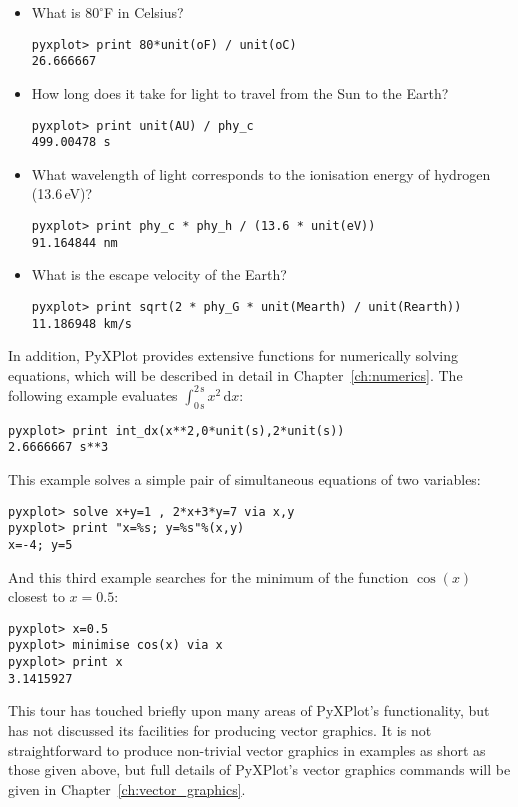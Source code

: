 \begin{itemize}
\item What is $80^\circ$F in Celsius?
\begin{verbatim}
pyxplot> print 80*unit(oF) / unit(oC)
26.666667
\end{verbatim}

\item How long does it take for light to travel from the Sun to the Earth?
\begin{verbatim}
pyxplot> print unit(AU) / phy_c
499.00478 s
\end{verbatim}

\item What wavelength of light corresponds to the ionisation energy of hydrogen (13.6\,eV)?
\begin{verbatim}
pyxplot> print phy_c * phy_h / (13.6 * unit(eV))
91.164844 nm
\end{verbatim}

\item What is the escape velocity of the Earth?
\begin{verbatim}
pyxplot> print sqrt(2 * phy_G * unit(Mearth) / unit(Rearth))
11.186948 km/s
\end{verbatim}
\end{itemize}

In addition, PyXPlot provides extensive functions for numerically solving
equations, which will be described in detail in Chapter~\ref{ch:numerics}. The
following example evaluates $\int_{0\,\mathrm{s}}^{2\,\mathrm{s}}
x^2\,\mathrm{d}x$:

\begin{verbatim}
pyxplot> print int_dx(x**2,0*unit(s),2*unit(s))
2.6666667 s**3
\end{verbatim}

\noindent This example solves a simple pair of simultaneous equations of two variables:

\begin{verbatim}
pyxplot> solve x+y=1 , 2*x+3*y=7 via x,y
pyxplot> print "x=%s; y=%s"%(x,y)
x=-4; y=5
\end{verbatim}

\noindent And this third example searches for the minimum of the function $\cos(x)$ closest to $x=0.5$:

\begin{verbatim}
pyxplot> x=0.5
pyxplot> minimise cos(x) via x
pyxplot> print x
3.1415927
\end{verbatim}

This tour has touched briefly upon many areas of PyXPlot's functionality, but
has not discussed its facilities for producing vector graphics. It is not
straightforward to produce non-trivial vector graphics in examples as short as
those given above, but full details of PyXPlot's vector graphics commands will
be given in Chapter~\ref{ch:vector_graphics}.

